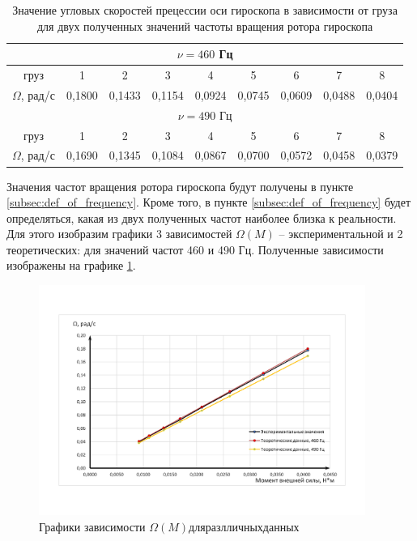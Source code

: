 \documentclass[12pt,a4paper]{article}
\begin{document}
\begin{table}[h!]
	\centering
		\begin{tabular}{|c|c|c|c|c|c|c|c|c|}
			\hline
			\multicolumn{9}{|c|}{$\nu=460$ Гц}                                                   \\ \hline
			груз         & 1      & 2      & 3      & 4      & 5      & 6      & 7      & 8      \\ \hline
			$\Omega$, рад/с & 0,1800 & 0,1433 & 0,1154 & 0,0924 & 0,0745 & 0,0609 & 0,0488 & 0,0404 \\ \hline
			\multicolumn{9}{|c|}{$\nu=490$ Гц}                                                   \\ \hline
			груз         & 1      & 2      & 3      & 4      & 5      & 6      & 7      & 8      \\ \hline
			$\Omega$, рад/с & 0,1690 & 0,1345 & 0,1084 & 0,0867 & 0,0700 & 0,0572 & 0,0458 & 0,0379 \\ \hline
		\end{tabular}
		\caption{Значение угловых скоростей прецессии оси гироскопа в зависимости от груза для двух полученных 	значений частоты вращения ротора гироскопа}
		\label{tab:teor_result_Omega_for_diffrent_frequency}
\end{table}
 
Значения частот вращения ротора гироскопа будут получены в пункте \ref{subsec:def_of_frequency}.
Кроме того, в пункте \ref{subsec:def_of_frequency} будет определяться, какая из двух полученных частот наиболее близка к реальности. Для этого изобразим графики 3 зависимостей $\Omega(M)$ -- экспериментальной и 2 теоретических: для значений частот 460 и 490 Гц. Полученные зависимости изображены на графике \ref{fig:diffrent_dependence_Omega}.

\begin{figure}[h!]
	\begin{center}
		\includegraphics[width = 0.95\textwidth]{Diffrent_Omega(M)_dependence_graphic_color}
		\caption{Графики зависимости $\Omega(M) для разлличных данных$}
		\label{fig:diffrent_dependence_Omega}
	\end{center}
\end{figure}
\end{document}
